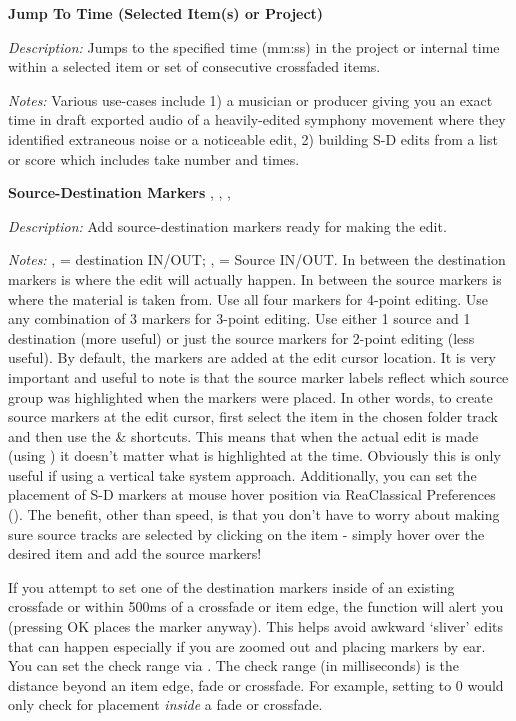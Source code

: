 \documentclass[10pt,american]{article}
\begin{document}
\textbf{Jump To Time (Selected Item(s) or Project) }\keys{\tab}

\emph{Description: }Jumps to the specified time (mm:ss) in the project or
internal time within a selected item or set of consecutive crossfaded items.

\emph{Notes: }Various use-cases include 1) a musician or producer giving you an
exact time in draft exported audio of a heavily-edited symphony movement where
they identified extraneous noise or a noticeable edit, 2) building S-D edits
from a list or score which includes take number and times.

\textbf{Source-Destination Markers }, , ,

\emph{Description:} Add source-destination markers ready for making the edit.

\emph{Notes: } ,  = destination IN/OUT;  ,  =
Source IN/OUT. In between the destination markers is where the edit will
actually happen. In between the source markers is where the material is taken
from. Use all four markers for 4-point editing. Use any combination of 3 markers
for 3-point editing. Use either 1 source and 1 destination (more useful) or just
the source markers for 2-point editing (less useful). By default, the markers
are added at the edit cursor location. It is very important and useful to note
is that the source marker labels reflect which source group was highlighted when
the markers were placed. In other words, to create source markers at the edit
cursor, first select the item in the chosen folder track and then use the
 \&  shortcuts. This means that when the actual edit is made
(using ) it doesn't matter what is highlighted at the time. Obviously
this is only useful if using a vertical take system approach. Additionally, you
can set the placement of S-D markers at mouse hover position via ReaClassical
Preferences (). The benefit, other than speed, is that you don't have
to worry about making sure source tracks are selected by clicking on the item -
simply hover over the desired item and add the source markers!

If you attempt to set one of the destination markers inside of an existing
crossfade or within 500ms of a crossfade or item edge, the function will alert
you (pressing OK places the marker anyway). This helps avoid awkward `sliver'
edits that can happen especially if you are zoomed out and placing markers by
ear. You can set the check range via . The check range (in
milliseconds) is the distance beyond an item edge, fade or crossfade. For
example, setting to 0 would only check for placement \emph{inside }a fade or
crossfade.
\end{document}

